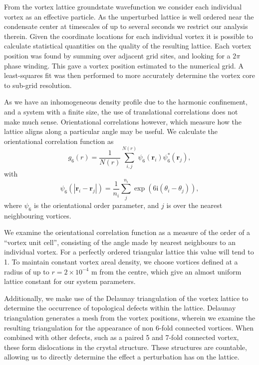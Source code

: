 From the vortex lattice groundstate wavefunction we consider each individual vortex as an effective particle. As the unperturbed lattice is well ordered near the condensate center at timescales of up to several seconds we restrict our analysis therein. Given the coordinate locations for each individual vortex it is possible to calculate statistical quantities on the quality of the resulting lattice. Each vortex position was found by summing over adjacent grid sites, and looking for a $2\pi$ phase winding. This gave a vortex position estimated to the numerical grid. A least-squares fit was then performed to more accurately determine the vortex core to sub-grid resolution.

As we have an inhomogeneous density profile due to the harmonic confinement, and a system with a finite size, the use of translational correlations does not make much sense. Orientational correlations however, which measure how the lattice aligns along a particular angle may be useful. We calculate the orientational correlation function as
\begin{equation}
	g_6(r) = \frac{1}{N(r)}\displaystyle\sum\limits_{i,j}^{N(r)}\psi_6(\mathbf{r}_i)\psi_6^{*}(\mathbf{r}_j),
\end{equation}
with
\begin{equation}
	\psi_6(|\mathbf{r}_{i} - \mathbf{r}_{j}|) = \frac{1}{n_i}\displaystyle\sum\limits_j^{n_i}\exp(6\mathrm{i}(\theta_i - \theta_j)),
\end{equation}
where $\psi_6$ is the orientational order parameter, and $j$ is over the nearest neighbouring vortices.

We examine the orientational correlation function as a measure of the order of a ``vortex unit cell'', consisting of the angle made by nearest neighbours to an individual vortex. For a perfectly ordered triangular lattice this value will tend to 1. To maintain constant vortex areal density, we choose vortices defined at a radius of up to $r=2\times 10^{-4}$ m from the centre, which give an almost uniform lattice constant for our system parameters.

Additionally, we make use of the Delaunay triangulation of the vortex lattice to determine the occurrence of topological defects within the lattice. Delaunay triangulation generates a mesh from the vortex positions, wherein we examine the resulting triangulation for the appearance of non 6-fold connected vortices. When combined with other defects, such as a paired 5 and 7-fold connected vortex, these form dislocations in the crystal structure. These structures are countable, allowing us to directly determine the effect a perturbation has on the lattice.

